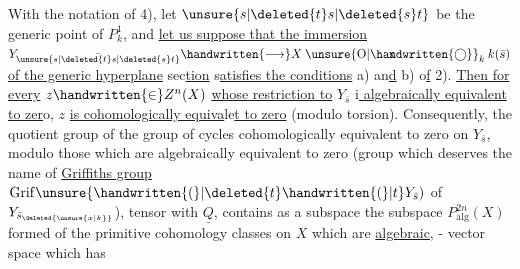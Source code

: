  With the notation of 4),  let $\unsure{s|\deleted{t}s|\deleted{s}t}$ be the generic point of $P^1_k$, and \uline{let us suppose that the immersion} $Y_{\bar{\unsure{s|\deleted{t}s|\deleted{s}t}}}\handwritten{\longrightarrow}X\mathbin{\ooalign{\hfil$\mathrm{x}$\hfil\cr\hfil$\unsure{\mathrm{O}|\handwritten{\bigcirc}}$\hfil\cr}}_k k(\bar s)$ \uline{of the generic hyperplane} sec\uline{tion}  s\uline{atisfies the conditions} a) an\uline{d} b) o\uline{f} 2). \uline{Then for every} $z\handwritten{\in}Z^n(X)$ \uline{whose restriction to} $Y_{\bar s}$ i\uline{ algebraically equivalent to zer}o, $z$ \uline{is cohomologically equiva}le\uline{t to zero} (modulo torsion).  Consequently, the quotient group of the group of cycles cohomologically equivalent to zero  on $Y_{\bar s}$, modulo those which are algebraically equivalent to zero (group which deserves the name of \uline{Griffiths group} $\mathrm{Grif}\unsure{\handwritten{(}|\deleted{t}\handwritten{(}|t}Y_{\bar s})$ of $Y_{\bar s_{\deleted{\unsure{x|k}}}}$), tensor with $\underline{Q}$, contains as a subspace the subspace $P^{2n}_{\mathrm{alg}}(X)$ formed of the primitive cohomology classes on $X$ which are \uline{algebraic}, - vector space which has
